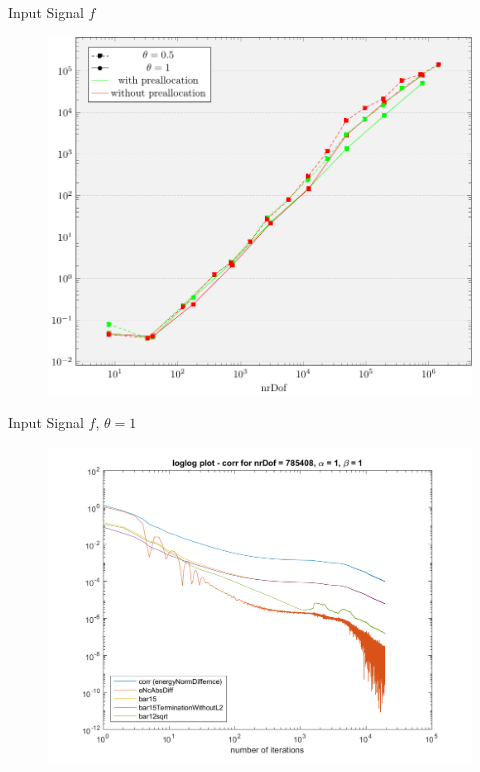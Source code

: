 
\begin{frame}{Input Signal $f$}
  \begin{figure}[!ht]
    \centering
    \includegraphics[width=0.8\linewidth]
      {pictures/experiments/appendix/timeCompPrealloc.pdf}
  \end{figure}
\end{frame}

\begin{frame}{Input Signal $f$, $\theta = 1$}
  \begin{figure}[!ht]
    \centering
    \includegraphics[width=0.9\linewidth]
      {pictures/experiments/appendix/f01UniformLvl8.png}
  \end{figure}
\end{frame}

